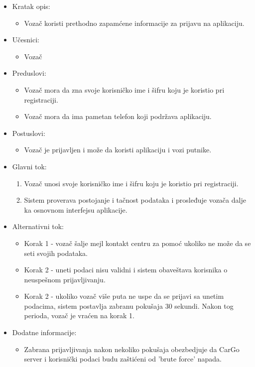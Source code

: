 \begin{itemize}
    \item Kratak opis:
        \begin{itemize}
            \item Vozač koristi prethodno zapamćene informacije za prijavu na aplikaciju.
        \end{itemize}
    \item Učesnici:
        \begin{itemize}
            \item Vozač
        \end{itemize}
    \item Preduslovi:
        \begin{itemize}
            \item Vozač mora da zna svoje korisničko ime i šifru koju je koristio pri registraciji.
            \item Vozač mora da ima pametan telefon koji podržava aplikaciju.
        \end{itemize}
    \item Postuslovi:
        \begin{itemize}
            \item Vozač je prijavljen i može da koristi aplikaciju i vozi putnike.
        \end{itemize}
    \item Glavni tok:
        \begin{enumerate}
            \item Vozač unosi svoje korisničko ime i šifru koju je koristio pri registraciji.
            \item Sistem proverava postojanje i tačnost podataka i prosleđuje vozača dalje ka osnovnom interfejsu aplikacije.
        \end{enumerate}
    \item Alternativni tok:
        \begin{itemize}
            \item Korak 1 - vozač šalje mejl kontakt centru za pomoć ukoliko ne može da se seti svojih podataka.
            \item Korak 2 - uneti podaci nisu validni i sistem obaveštava korisnika o neuspešnom prijavljivanju.
            \item Korak 2 - ukoliko vozač više puta ne uspe da se prijavi sa unetim podacima, sistem postavlja zabranu pokušaja 30 sekundi. Nakon tog perioda, vozač je vraćen na korak 1.
        \end{itemize}
    \item Dodatne informacije:
        \begin{itemize}
            \item Zabrana prijavljivanja nakon nekoliko pokušaja obezbedjuje da CarGo server i korisnički podaci budu zaštićeni od 'brute force' napada.
        \end{itemize}
\end{itemize}

